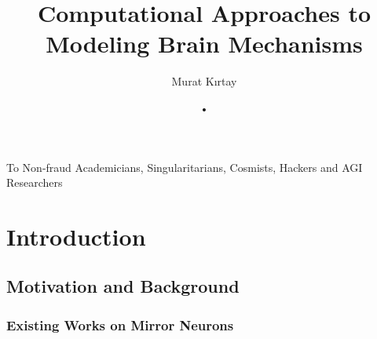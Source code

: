 \documentclass[a4,12pt]{ozu-thesis}
\title{Computational Approaches to Modeling Brain Mechanisms} %
\author{Murat K{\i}rtay}
\newcommand{\todo}[1]{\textcolor{red}{TODO: #1}\PackageWarning{TODO:}{#1!}}
\begin{document}


\begin{preliminary}

\begin{dedication}
\null\vfil
{\large
\begin{center}
To Non-fraud Academicians, Singularitarians, Cosmists, Hackers and AGI Researchers

\end{center}}
\vfil\null
\end{dedication}

\begin{abstract}


\end{abstract}

\begin{ozetce}


\end{ozetce}

\begin{acknowledgements}



\end{acknowledgements}


\contents
%

\end{preliminary}

\chapter{Introduction}



\section{Motivation and Background}
\author{•}


\subsection{Existing Works on Mirror Neurons}

\end{document}
